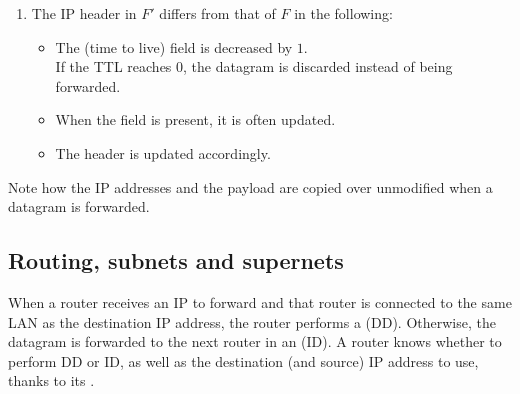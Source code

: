\begin{enumerate}
\begin{enumerate}[label=\alph*)]
  \item The IP header in $F'$ differs from that of $F$ in the following:
    \begin{itemize}
    \item The  (time to live) field is decreased by $1$.\\
    If the TTL reaches $0$, the datagram is discarded instead of being forwarded.
    \item When the  field is present, it is often updated.
    \item The header  is updated accordingly.\\
    \end{itemize}
  \end{enumerate}
\end{enumerate}

\begin{remark}
 Note how the IP addresses and the payload are copied over unmodified
  when a datagram is forwarded.
\end{remark}


\subsection{Routing, subnets and supernets}\label{sec:layer3:routing}

When a router receives an IP  to forward and that router 
is connected to the same LAN as the destination IP address, the router performs a  (DD).
% 
Otherwise, the datagram is forwarded to the next router in an  (ID).
% 
A router knows whether to perform DD or ID, as well as the destination (and source) IP address to use,
thanks to its .

